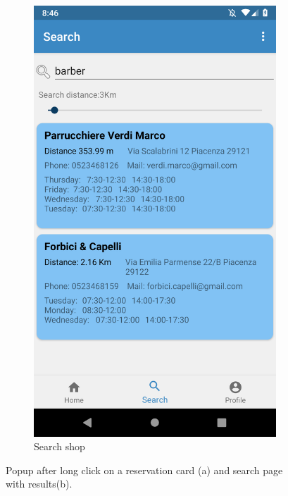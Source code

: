 \begin{figure}[h]
\begin{subfigure}{.5\textwidth}
  \includegraphics[height=.4\textheight, keepaspectratio=true]{Img/Screens/Customer_Search}
  \caption{Search shop}
\end{subfigure}
\caption{Popup after long click on a reservation card (a) and search page with results(b).}
\end{figure}


